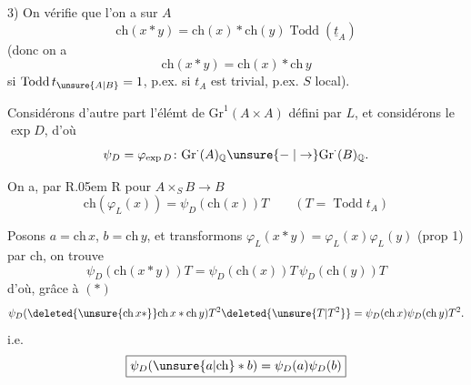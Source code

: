 3) On vérifie  que l'on a sur $A$
\[
\mathrm{ch}(x*y)=\mathrm{ch}(x)*\mathrm{ch}(y)\operatorname{Todd}(\underline t_A)\tag*{$(*)$}
\]
(donc on a
\[
\mathrm{ch}(x*y)=\mathrm{ch}(x)*\mathrm{ch}\,y
\]
si $\operatorname{Todd}t_{\unsure{A|B}}=1$, p.ex. si $t_A$ est trivial, p.ex. $S$ local).

Considérons d'autre part l'élémt  de $\mathrm{Gr}^1(A\times A)$ défini par $L$, et considérons le $\exp D$, d'où
\[
\psi_D=\varphi_{\exp D}\colon\mathrm{Gr}^{\cdot}(A)_{\mathbb Q}\unsure{\mathrel{-}|\to}\mathrm{Gr}^{\cdot}(B)_{\mathbb Q}.
\]


 On a, par R\kern.05em R pour $A\times_S B\longrightarrow B$
\[
\mathrm{ch}(\varphi_L(x))=\psi_D(\mathrm{ch}(x))T\qquad (T=\operatorname{Todd}t_A)
\]
  

Posons $a=\mathrm{ch}\,x$, $b=\mathrm{ch}\,y$, et transformons $\varphi_L(x*y)=\varphi_L(x)\varphi_L(y)$ (prop 1) par $\mathrm{ch}$, on trouve
\[
\psi_D(\mathrm{ch}(x*y))T=\psi_D(\mathrm{ch}(x))T\,\psi_D(\mathrm{ch}(y))T
\]
 d'où,  grâce à $(*)$
\[
\psi_D(\deleted{\unsure{\mathrm{ch}\,x*}}\mathrm{ch}\,x*\mathrm{ch}\,y)T^{2}\deleted{\unsure{T|T^2}}=\psi_D(\mathrm{ch}\,x)\psi_D(\mathrm{ch}\,y)T^2.
\]
i.e.
\[
\boxed{\psi_D(\unsure{a|\mathrm{ch}}*b)=\psi_D(a)\psi_D(b)}
\]
